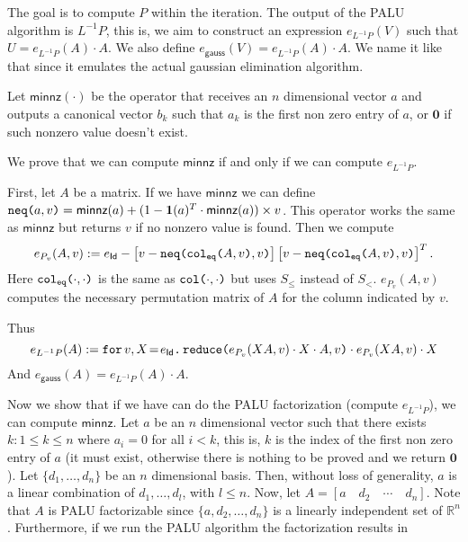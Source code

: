 The goal is to compute $P$ within the iteration. The output of the PALU algorithm is $L^{-1}P$, this is, we aim to construct an expression $e_{L^{-1}P}(V)$ such that $U=e_{L^{-1}P}(A)\cdot A$. We also define $e_{\mathsf{gauss}}(V)=e_{L^{-1}P}(A)\cdot A$. We name it like that since it emulates the actual gaussian elimination algorithm.

Let $\mathsf{minnz}(\cdot)$ be the operator that receives an $n$ dimensional vector $a$ and outputs a canonical vector $b_k$ such that $a_k$ is the first non zero entry of $a$, or $\mathbf{0}$ if such nonzero value doesn't exist. 

We prove that we can compute $\mathsf{minnz}$ if and only if we can compute $e_{L^{-1}P}$.

First, let $A$ be a matrix. If we have $\mathsf{minnz}$ we can define $\nneq{a}{v} = \mathsf{minnz}(a) + (1 - \ones(a)^T\cdot \mathsf{minnz}(a))\times v$. This operator works the same as $\mathsf{minnz}$ but returns $v$ if no nonzero value is found.
Then we compute $$e_{P_v}(A,v) := e_{\mathsf{Id}} - \left[ v - \nneq{ \ccoleq{A}{v} }{v} \right]\left[ v - \nneq{ \ccoleq{A}{v} }{v} \right]^T.$$ Here $\ccoleq{\cdot}{\cdot}$ is the same as $\ccol{\cdot}{\cdot}$ but uses $S_{\leq}$ instead of $S_{<}$. $e_{P_v}(A,v)$ computes the necessary permutation matrix of $A$ for the column indicated by $v$.

Thus $$e_{L^{-1}P}(A):=\initf{e_{\mathsf{Id}}}{v}{X}{\red{e_{P_v}(XA,v)\cdot X\cdot A}{v}\cdot e_{P_v}(XA,v)\cdot X}$$
And $e_{\mathsf{gauss}}(A)=e_{L^{-1}P}(A)\cdot A$.

Now we show that if we have can do the PALU factorization (compute $e_{L^{-1}P}$), we can compute $\mathsf{minnz}$. Let $a$ be an $n$ dimensional vector such that there exists $k:1\leq k\leq n$ where $a_i=0$ for all $i<k$, this is, $k$ is the index of the first non zero entry of $a$ (it must exist, otherwise there is nothing to be proved and we return $\mathbf{0}$). Let $\lbrace d_1, \ldots, d_n\rbrace$ be an $n$ dimensional basis. Then, without loss of generality, $a$ is a linear combination of $d_1, \ldots, d_l$, with $l \leq n$. Now, let $A = \left[ a\hspace{1em} d_2 \hspace{1em} \cdots \hspace{1em}  d_n \right].$ Note that $A$ is PALU factorizable since $\lbrace a, d_2, \ldots, d_n\rbrace$ is a linearly independent set of $\mathbb{R}^n$. Furthermore, if we run the PALU algorithm the factorization results in

